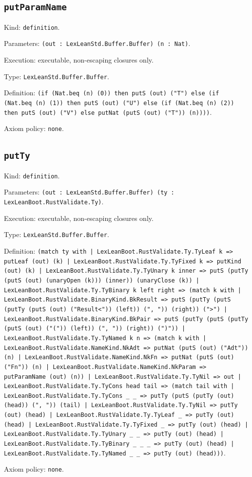 \documentclass[11pt]{article}
\begin{document}
\subsection*{\texttt{putParamName}}
\noindent Kind: \texttt{definition}.\par
\noindent Parameters: \texttt{(out : LexLeanStd.Buffer.Buffer) (n : Nat)}.\par
\noindent Execution: executable, non-escaping closures only.\par
\noindent Type: \texttt{LexLeanStd.Buffer.Buffer}.\par
\noindent Definition: \texttt{(if (Nat.beq (n) (0)) then putS (out) ("T") else (if (Nat.beq (n) (1)) then putS (out) ("U") else (if (Nat.beq (n) (2)) then putS (out) ("V") else putNat (putS (out) ("T")) (n))))}.\par
\noindent Axiom policy: \texttt{none}.\par
\subsection*{\texttt{putTy}}
\noindent Kind: \texttt{definition}.\par
\noindent Parameters: \texttt{(out : LexLeanStd.Buffer.Buffer) (ty : LexLeanBoot.RustValidate.Ty)}.\par
\noindent Execution: executable, non-escaping closures only.\par
\noindent Type: \texttt{LexLeanStd.Buffer.Buffer}.\par
\noindent Definition: \texttt{(match ty with | LexLeanBoot.RustValidate.Ty.TyLeaf k => putLeaf (out) (k) | LexLeanBoot.RustValidate.Ty.TyFixed k => putKind (out) (k) | LexLeanBoot.RustValidate.Ty.TyUnary k inner => putS (putTy (putS (out) (unaryOpen (k))) (inner)) (unaryClose (k)) | LexLeanBoot.RustValidate.Ty.TyBinary k left right => (match k with | LexLeanBoot.RustValidate.BinaryKind.BkResult => putS (putTy (putS (putTy (putS (out) ("Result<")) (left)) (", ")) (right)) (">") | LexLeanBoot.RustValidate.BinaryKind.BkPair => putS (putTy (putS (putTy (putS (out) ("(")) (left)) (", ")) (right)) (")")) | LexLeanBoot.RustValidate.Ty.TyNamed k n => (match k with | LexLeanBoot.RustValidate.NameKind.NkAdt => putNat (putS (out) ("Adt")) (n) | LexLeanBoot.RustValidate.NameKind.NkFn => putNat (putS (out) ("Fn")) (n) | LexLeanBoot.RustValidate.NameKind.NkParam => putParamName (out) (n)) | LexLeanBoot.RustValidate.Ty.TyNil => out | LexLeanBoot.RustValidate.Ty.TyCons head tail => (match tail with | LexLeanBoot.RustValidate.Ty.TyCons \_ \_ => putTy (putS (putTy (out) (head)) (", ")) (tail) | LexLeanBoot.RustValidate.Ty.TyNil => putTy (out) (head) | LexLeanBoot.RustValidate.Ty.TyLeaf \_ => putTy (out) (head) | LexLeanBoot.RustValidate.Ty.TyFixed \_ => putTy (out) (head) | LexLeanBoot.RustValidate.Ty.TyUnary \_ \_ => putTy (out) (head) | LexLeanBoot.RustValidate.Ty.TyBinary \_ \_ \_ => putTy (out) (head) | LexLeanBoot.RustValidate.Ty.TyNamed \_ \_ => putTy (out) (head)))}.\par
\noindent Axiom policy: \texttt{none}.\par
\end{document}
